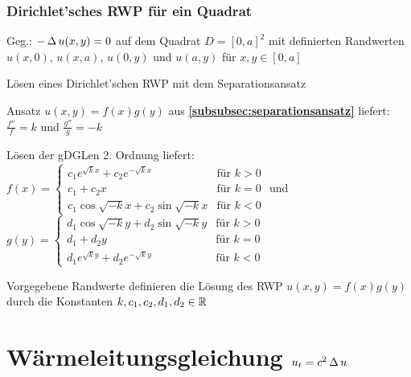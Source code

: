 \documentclass[german,color,5pt]{latex4ei/latex4ei_fs}
\begin{document}
\begin{sectionbox}
	\subsubsection{Dirichlet'sches RWP für ein Quadrat}
	Geg.: $-\operatorname{\Delta} u(x,y)=0$ auf dem Quadrat $D=[0,a]^2$ mit definierten Randwerten $u(x,0)$, $u(x,a)$, $u(0,y)$ und $u(a,y)$ für $x,y\in [0,a]$
	\begin{cookbox}{Lösen eines Dirichlet'schen RWP mit dem Separationsansatz}
		\item Ansatz $u(x,y)=f(x)g(y)$ aus {\bf\ref{subsubsec:separationsansatz}} liefert: $\frac{f''}{f}=k$ und $\frac{g''}{g}=-k$
		\item Lösen der gDGLen 2. Ordnung liefert:\\
		$f(x)=\begin{cases}
		c_1e^{\sqrt{k}x}+c_2e^{-\sqrt{k}x} & \text{für } k>0\\
		c_1+c_2x & \text{für }  k=0\\
		c_1\cos\sqrt{-k}x+c_2\sin\sqrt{-k}x & \text{für } k<0
		\end{cases}$ \qquad und \\
		$g(y)=\begin{cases}
		d_1\cos\sqrt{-k}y+d_2\sin\sqrt{-k}y & \text{für } k>0\\
		d_1+d_2y & \text{für }  k=0\\
		d_1e^{\sqrt{k}y}+d_2e^{-\sqrt{k}y} & \text{für } k<0
		\end{cases}$
		\item Vorgegebene Randwerte definieren die Lösung des RWP $u(x,y)=f(x)g(y)$ durch die Konstanten $k,c_1,c_2,d_1,d_2\in\operatorname{\mathbb R}$
	\end{cookbox}
\end{sectionbox}

\section{Wärmeleitungsgleichung \quad \(u_{t}=c^{2} \operatorname{\Delta}{u}\)}
\end{document}
